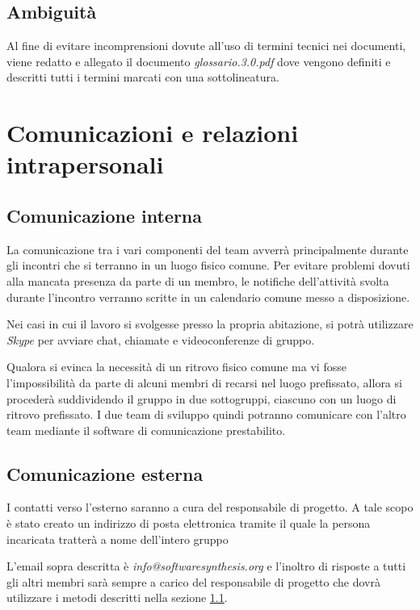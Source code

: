 \subsection{Ambiguità}
Al fine di evitare incomprensioni dovute all'uso di termini tecnici nei documenti, viene redatto e allegato il documento \textit{glossario.3.0.pdf} dove vengono definiti e descritti tutti i termini marcati con una sottolineatura.
\clearpage

\section{Comunicazioni e relazioni intrapersonali}
\subsection{Comunicazione interna}
\label{sec:comunicazione_interna}
La comunicazione tra i vari componenti del team avverrà principalmente durante gli incontri che si terranno in un luogo fisico comune. Per evitare problemi dovuti alla mancata presenza da parte di un membro, le notifiche dell'attività svolta durante l'incontro verranno scritte in un calendario comune messo a disposizione.

Nei casi in cui il lavoro si svolgesse presso la propria abitazione, si potrà utilizzare \textit{Skype} per avviare chat, chiamate e videoconferenze di gruppo.

Qualora si evinca la necessità di un ritrovo fisico comune ma vi fosse l'impossibilità da parte di alcuni membri di recarsi nel luogo prefissato, allora si procederà suddividendo il gruppo in due sottogruppi, ciascuno con un luogo di ritrovo prefissato. I due team di sviluppo quindi potranno comunicare con l'altro team mediante il software di comunicazione prestabilito.


\subsection{Comunicazione esterna}
I contatti verso l'esterno saranno a cura del responsabile di progetto. A tale scopo è stato creato un indirizzo di posta elettronica tramite il quale la persona incaricata tratterà a nome dell'intero gruppo \team{}

L'email sopra descritta è \textit{info@softwaresynthesis.org} e l'inoltro di risposte a tutti gli altri membri sarà sempre a carico del responsabile di progetto che dovrà utilizzare i metodi descritti nella sezione \ref{sec:comunicazione_interna}.


